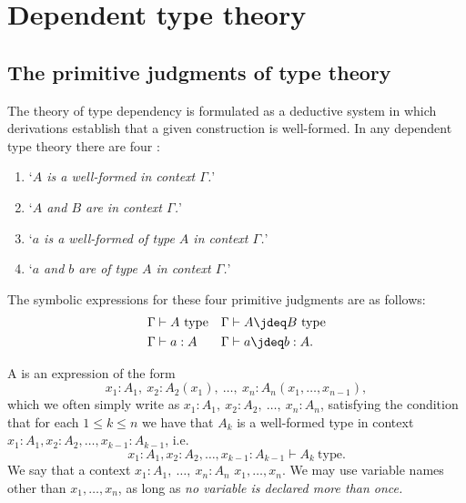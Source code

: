\chapter{Dependent type theory}
\label{ch:dtt}

\section{The primitive judgments of type theory}

The theory of type dependency is formulated as a deductive system in which derivations establish that a given construction is well-formed. In any dependent type theory there are four :
\begin{enumerate}
\item `\emph{$A$ is a well-formed  in context $\Gamma$.}'
\item `\emph{$A$ and $B$ are  in context $\Gamma$.}'
\item `\emph{$a$ is a well-formed  of type $A$ in context $\Gamma$.}'
\item `\emph{$a$ and $b$ are  of type $A$ in context $\Gamma$.}'
\end{enumerate}
\begin{samepage}
The symbolic expressions for these four primitive judgments are as follows:
\begin{align*}
\Gamma & \vdash A~\textrm{type} & \Gamma & \vdash A\jdeq B~\textrm{type}\\
\Gamma & \vdash a:A & \Gamma & \vdash a\jdeq b:A.
\end{align*}
\end{samepage}
A  is an expression of the form
\begin{equation*}
x_1:A_1,~x_2:A_2(x_1),~\ldots,~x_n:A_n(x_1,\ldots,x_{n-1}),
\end{equation*}
which we often simply write as $x_1:A_1,~x_2:A_2,~\ldots,~x_n:A_n$,
satisfying the condition that for each $1\leq k\leq n$ we have that $A_k$ is a well-formed type in context $x_1:A_1,x_2:A_2,\ldots,x_{k-1}:A_{k-1}$, i.e.
\begin{equation*}
x_1:A_1,x_2:A_2,\ldots,x_{k-1}:A_{k-1} \vdash A_k~\textrm{type}.
\end{equation*}
We say that a context $x_1:A_1,~\ldots,~x_n:A_n$  $x_1,\ldots,x_n$. 
We may use variable names other than $x_1,\ldots,x_n$, as long as \emph{no variable is declared more than once.} 

